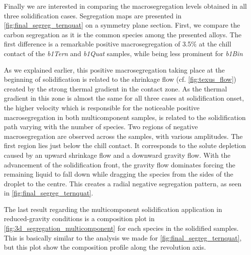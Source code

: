 Finally we are interested in comparing the macrosegregation levels obtained in all three solidification cases. Segregation maps
are presented in \cref{fig:final_segreg_ternquat} on a symmetry plane section. First, we compare the carbon segregation as it is the common species among the presented alloys.
The first difference is a remarkable positive macrosegregation of 3.5\% at the chill contact of the  \emph{b1Tern} and \emph{b1Quat} samples, 
while being less prominent for \emph{b1Bin} 

As we explained earlier, this positive macrosegregation taking place at the beginning
of solidification is related to the shrinkage flow (cf. \cref{fig:texus_flow}) created by the strong thermal gradient in the contact zone. 
As the thermal gradient in this zone is almost the same
for all three cases at solidification onset, the higher velocity which is responsible for the noticeable positive macrosegregation in both multicomponent samples,
is related to the solidification path varying with the number of species.
Two regions of negative macrosegregation are observed across the samples, with various amplitudes. The first region lies just below the chill contact.
It corresponds to the solute depletion caused by an upward shrinkage flow and a downward gravity flow. 
With the advancement of the solidification front,
the gravity flow dominates forcing the remaining liquid to fall down while dragging the species from the sides of the droplet to the centre.
This creates a radial negative segregation pattern, as seen in \cref{fig:final_segreg_ternquat}. 

The last result regarding the multicomponent solidification application in reduced-gravity conditions 
is a composition plot in \cref{fig:3d_segregation_multicomponent} for each species in the solidified samples. 
This is basically similar to the analysis we made for \cref{fig:final_segreg_ternquat}, 
but this plot show the composition profile along the revolution axis.


